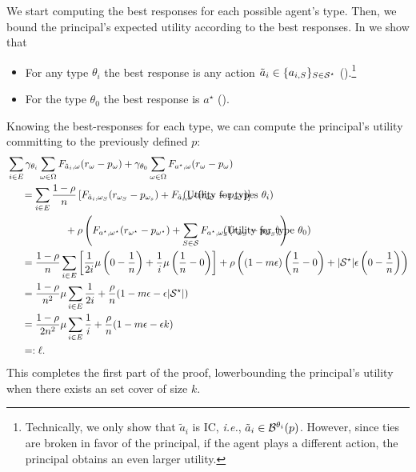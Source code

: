     We start computing the best responses for each possible agent's type. Then, we bound the principal's expected utility according to the best responses.
%
    In  we show that
    \begin{itemize}
        \item For any type $\theta_i$ the best response is any action $\tilde a_i\in\{a_{i,S}\}_{S\in\mathcal{S}^\star}$ ().\footnote{Technically, we only show that $\tilde a_i$ is IC, \emph{i.e.}, $\tilde a_i\in \mathcal{B}^{\theta_i}(p)$. However, since ties are broken in favor of the principal, if the agent plays a different action, the principal obtains an even larger utility. }
        \item For the type $\theta_0$ the best response is $a^\star$ ().
    \end{itemize}

    
	
	Knowing the best-responses for each type, we can compute the principal's utility committing to the previously defined $p$:
	\begin{align*}
		&\sum_{i \in E} \gamma_{\theta_i} \sum_{\omega\in \Omega}F_{\tilde a_{i},\omega}(r_\omega-p_\omega) + \gamma_{\theta_0} \sum_{\omega\in\Omega }F_{a^\star,\omega}(r_\omega - p_\omega)\\
		& \hspace{0.5cm}=\sum_{i\in E} \frac{1-\rho}{n} \left[F_{\tilde a_{i},\omega_S}(r_{\omega_S}-p_{\omega_s})+F_{\tilde a_{i},\omega^\star}(r_{\omega^\star}-p_{\omega^\star})\right]\tag*{\makebox[1pt][r]{(Utility for types $\theta_i$)}}
		\\
		& \hspace{2cm}+ \rho\left(F_{a^\star,\omega^\star}(r_{\omega^\star}-p_{\omega^\star})+\sum_{S\in\Scal}F_{a^\star,\omega_S}(r_{\omega_S}-p_{\omega_S})\right)\tag*{\makebox[1pt][r]{(Utility for type $\theta_0$)}}\\
		&\hspace{0.5cm}=\frac{1-\rho}{n}\sum_{i\in E}\left[\frac{1}{2i}\mu\left(0-\frac{1}{n}\right)+\frac{1}{i}\mu\left(\frac{1}{n}-0\right)\right]+\rho\left((1-m\epsilon)\left(\frac{1}{n}-0\right)+|\Scal^\star|\epsilon\left(0-\frac{1}{n}\right)\right)\\
		&\hspace{0.5cm}=\frac{1-\rho}{n^2} \mu \sum_{i\in E} \frac{1}{2i}+\frac{\rho}{n}(1-m\epsilon-\epsilon|\Scal^\star|)\\
		&\hspace{0.5cm}=\frac{1-\rho}{2n^2}  \mu\sum_{i\in E}\frac{1}{i}+\frac{\rho}{n}(1-m\epsilon-\epsilon k)\\
        &\hspace{0.5cm}=:\ell.
	\end{align*}
    This completes the first part of the proof, lowerbounding the principal's utility when there exists an set cover of size $k$.
	
